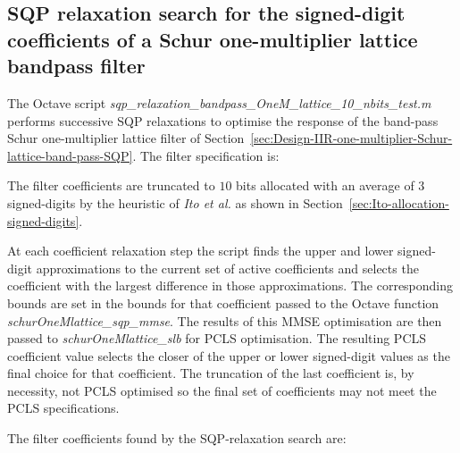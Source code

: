 \documentclass[a4paper,twoside,10pt,english]{report}
\begin{document}
\subsection{\label{sec:SQP-relaxation-search-signed-digit-coefficients-bandpass}SQP relaxation search for the signed-digit coefficients of a Schur one-multiplier lattice bandpass filter}
The Octave script 
\emph{sqp\_relaxation\_bandpass\_OneM\_lattice\_10\_nbits\_test.m} performs
successive SQP relaxations to optimise the response of the band-pass Schur
one-multiplier lattice filter of
Section~\ref{sec:Design-IIR-one-multiplier-Schur-lattice-band-pass-SQP}. The 
filter specification is:
\begin{small}

\end{small} 
The filter coefficients are truncated to $10$ bits allocated with an average of
$3$ signed-digits by the heuristic of \emph{Ito et al.} as shown in
Section~\ref{sec:Ito-allocation-signed-digits}. 

At each coefficient relaxation step the script finds the upper and lower
signed-digit approximations to the current set of active coefficients and
selects the coefficient with the largest difference in those approximations. The
corresponding bounds are set in the bounds for that coefficient passed to the
Octave function \emph{schurOneMlattice\_sqp\_mmse}. The results of this MMSE
optimisation are then passed to \emph{schurOneMlattice\_slb} for PCLS
optimisation. The resulting PCLS coefficient value selects the closer of the
upper or lower signed-digit values as the final choice for that coefficient. The
truncation of the last coefficient is, by necessity, not PCLS optimised so the
final set of coefficients may not meet the PCLS specifications.

The filter coefficients found by the SQP-relaxation search are:
\begin{small}


\end{small}
\end{document}
